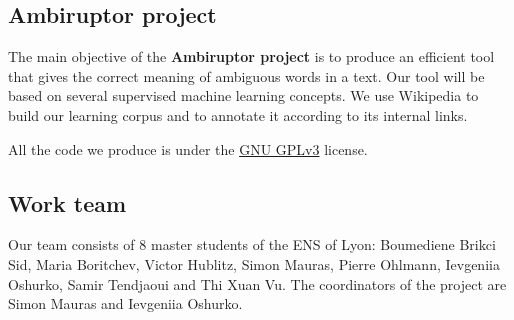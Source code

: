 \documentclass[11pt,a4paper]{article}
\begin{document}
\subsection{Ambiruptor project}

The main objective of the \textbf{Ambiruptor project} is to produce an efficient tool that gives the correct meaning of ambiguous words in a text. Our tool will be based on several supervised machine learning concepts. We use Wikipedia to build our learning corpus and to annotate it according to its internal links.

\noindent All the code we produce is under the \href{http://www.gnu.org/licenses/gpl-3.0.html}{GNU GPLv3} license.

\subsection{Work team}

Our team consists of 8 master students of the ENS of Lyon: Boumediene Brikci Sid, Maria Boritchev, Victor Hublitz, Simon Mauras, Pierre Ohlmann, Ievgeniia Oshurko, Samir Tendjaoui and Thi Xuan Vu. The coordinators of the project are Simon Mauras and Ievgeniia Oshurko.
\end{document}
